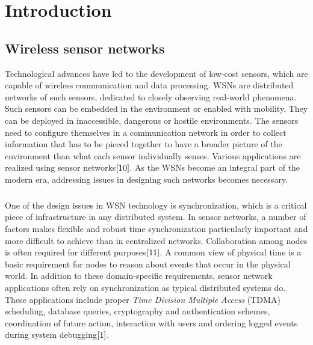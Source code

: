 \documentclass[a4paper,10pt]{report}
\begin{document}
\chapter{\textbf{Introduction}}
\section{\textbf{Wireless sensor networks}}\par
Technological advances have led to the development of low-cost sensors, which are capable of wireless communication and
data processing. WSNs are distributed networks of such sensors, dedicated to closely observing real-world phenomena. Such sensors can be embedded in the environment or enabled with mobility. They can be deployed in
inaccessible, dangerous or hostile environments. The sensors need to configure themselves in a communication network in order to collect information that has to be pieced together to have a broader picture of the environment than what each sensor individually
senses. Various applications are realized using sensor networks$\cite{10}$. As the WSNs become an integral part of the modern era, addressing issues in designing such networks becomes necessary.
\paragraph*{} One of the design issues in WSN technology is synchronization, which is a critical piece of infrastructure in any
distributed system. In sensor networks, a number of factors makes flexible and robust time synchronization particularly important and
more difficult to achieve than in centralized networks. Collaboration among nodes is often required for different purposes$\cite{11}$. A common view of physical time is a basic requirement for nodes to reason about events that occur in the physical world. In addition to these domain-specific requirements, sensor network applications often rely on synchronization as typical distributed systems do. These applications include proper \textit{Time Division Multiple Access} (TDMA) scheduling, database queries, cryptography and authentication schemes, coordination of future action, interaction with users and ordering logged events during system debugging$\cite{1}$.
\end{document}
